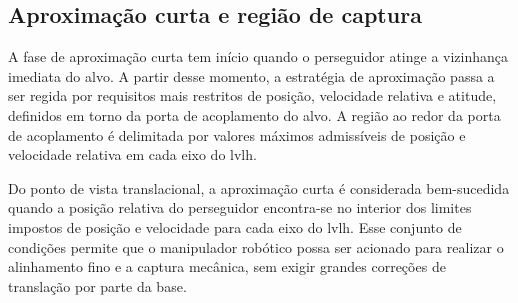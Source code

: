 \subsection{Aproximação curta e região de captura}
\label{sec:aprox_curta_regiao_captura}

A fase de aproximação curta tem início quando o perseguidor atinge a vizinhança imediata do alvo.
A partir desse momento, a estratégia de aproximação passa a ser regida por requisitos mais restritos de posição, velocidade relativa e atitude, definidos em torno da porta de acoplamento do alvo.
A região ao redor da porta de acoplamento é delimitada por valores máximos admissíveis de posição e velocidade relativa em cada eixo do \gls{lvlh}.

Do ponto de vista translacional, a aproximação curta é considerada bem-sucedida quando a posição relativa do perseguidor encontra-se no interior dos limites impostos de posição e velocidade para cada eixo do \gls{lvlh}.
Esse conjunto de condições permite que o manipulador robótico possa ser acionado para realizar o alinhamento fino e a captura mecânica, sem exigir grandes correções de translação por parte da base.
